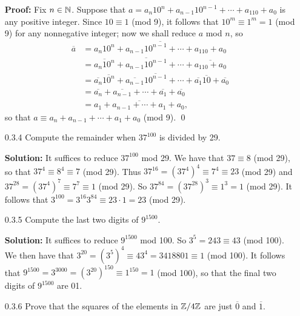 \begin{enumerate}
      \textbf{Proof:} Fix $n \in \mathbb{N}$. Suppose that $a = a_n10^n +
      a_{n - 1}10^{n - 1} + \cdots + a_110 + a_0$ is any positive integer. Since
      $10 \equiv 1$ (mod 9), it follows that $10^m \equiv 1^m = 1$ (mod 9) for
      any nonnegative integer; now we shall reduce $a$ mod $n$, so
      \begin{align*}
         \overline{a} &= \overline{a_n10^n + a_{n - 1}10^{n - 1} + \cdots +
                         a_110 + a_0} \\
                      &= \overline{a_n10^n} + \overline{a_{n - 1}10^{n - 1}} +
                         \cdots + \overline{a_110 + a_0} \\
                      &= \overline{a_n}\overline{10^n} +
                         \overline{a_{n - 1}}\overline{10^{n - 1}} + \cdots +
                         \overline{a_1}\overline{10} + \overline{a_0} \\
                      &= \overline{a_n} + \overline{a_{n - 1}} + \cdots +
                         \overline{a_1} + \overline{a_0} \\
                      &= \overline{a_1 + a_{n - 1} + \cdots + a_1 + a_0},
      \end{align*}
      so that $a \equiv a_n + a_{n - 1} + \cdots + a_1 + a_0$ (mod 9). \qed
   \item[0.3.4]   Compute the remainder when $37^{100}$ is divided by 29.
   
      \textbf{Solution:} It suffices to reduce $37^{100}$ mod 29. We have that
      $37 \equiv 8$ (mod 29), so that $37^4 \equiv 8^4 \equiv 7$ (mod 29). Thus
      $37^{16} = (37^4)^4 \equiv 7^4 \equiv 23$ (mod 29) and
      $37^{28} = (37^4)^7 \equiv 7^7 \equiv 1$ (mod 29).
      So $37^{84} = (37^{28})^3 \equiv 1^3 = 1$ (mod 29). It follows that
      $3^{100} = 3^{16}3^{84} \equiv 23 \cdot 1 = 23$ (mod 29).
   \item[0.3.5]   Compute the last two digits of $9^{1500}$.
   
      \textbf{Solution:} It suffices to reduce $9^{1500}$ mod 100. So
       $3^5 = 243 \equiv 43$ (mod 100). We then have that
       $3^{20} = (3^5)^4 \equiv 43^4 = 3418801 \equiv 1$ (mod 100). It follows
       that $9^{1500} = 3^{3000} = (3^{20})^{150} \equiv 1^{150} = 1$ (mod 100),
       so that the final two digits of $9^{1500}$ are 01.
   \item[0.3.6]   Prove that the squares of the elements in $\mathbb{Z}/4\mathbb{Z}$ are just
                  $\overline{0}$ and $\overline{1}$.
                  

\end{enumerate}
